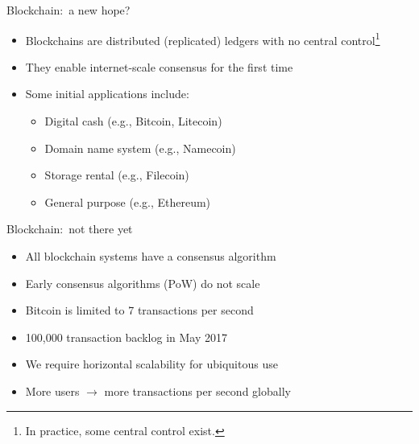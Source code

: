 \documentclass{beamer}
\begin{document}
\begin{frame}{Blockchain:~a new hope?}
  \begin{itemize}
    \item Blockchains are distributed (replicated) ledgers with no central control\footnote{In practice, some central control exist.}
    \item They enable internet-scale consensus for the first time
    \item Some initial applications include:
    \begin{itemize}
      \item Digital cash (e.g., Bitcoin, Litecoin)
      \item Domain name system (e.g., Namecoin)
      \item Storage rental (e.g., Filecoin)
      \item General purpose (e.g., Ethereum)
    \end{itemize}
  \end{itemize}
\end{frame}

\begin{frame}{Blockchain:~not there yet}
  \begin{itemize}
    \item All blockchain systems have a consensus algorithm
    \item Early consensus algorithms (PoW) do not scale
    \item Bitcoin is limited to 7 transactions per second
    \item 100,000 transaction backlog in May 2017
    \item We require horizontal scalability for ubiquitous use
    \item More users $\rightarrow$ more transactions per second globally
  \end{itemize}
\end{frame}
\end{document}
